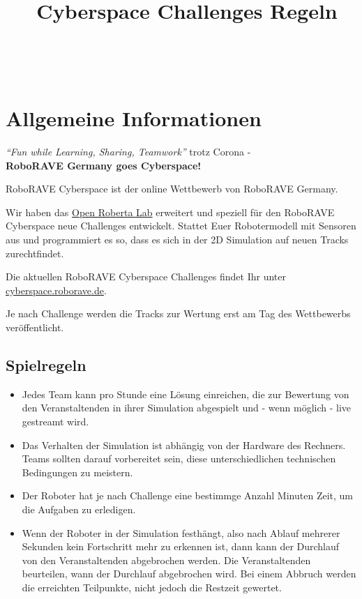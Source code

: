 \documentclass[a4paper,12pt]{article}
\begin{document}


\title{\tagYear\ Cyberspace Challenges Regeln}
\makeatletter
\let\inserttitle\@title
\makeatother
\begin{center}
	\rrcybLogo
	\huge                      %
	\bfseries                   %
	\\
	\inserttitle
\end{center}

\section{Allgemeine Informationen}

\begin{center}
\emph{"`Fun while Learning, Sharing, Teamwork"'} trotz Corona -
\\
\textbf{RoboRAVE Germany goes Cyberspace!}
\end{center}

RoboRAVE Cyberspace ist der online Wettbewerb von RoboRAVE Germany.

Wir haben das
\href{https://www.roberta-home.de/lab/}{Open Roberta Lab}
erweitert und speziell für den RoboRAVE Cyberspace neue Challenges entwickelt.
Stattet Euer Robotermodell mit Sensoren aus und programmiert es so, dass es
sich in der 2D Simulation auf neuen Tracks zurechtfindet.

Die aktuellen RoboRAVE Cyberspace Challenges findet Ihr unter
\href{https://cyberspace.roborave.de}{cyberspace.roborave.de}.

Je nach Challenge werden die Tracks zur Wertung erst am Tag des Wettbewerbs
veröffentlicht.

\subsection{Spielregeln}

\begin{itemize}
	\item Jedes Team kann pro Stunde eine Lösung einreichen, die zur
Bewertung von den Veranstaltenden in ihrer Simulation abgespielt und - wenn
möglich - live gestreamt wird.
	\item Das Verhalten der Simulation ist abhängig von der Hardware des
Rechners. Teams sollten darauf vorbereitet sein, diese unterschiedlichen
technischen Bedingungen zu meistern.
	\item Der Roboter hat je nach Challenge eine bestimmge Anzahl Minuten
Zeit, um die Aufgaben zu erledigen.
	\item Wenn der Roboter in der Simulation festhängt, also nach Ablauf
mehrerer Sekunden kein Fortschritt mehr zu erkennen ist, dann kann der
Durchlauf von den Veranstaltenden abgebrochen werden. Die Veranstaltenden
beurteilen, wann der Durchlauf abgebrochen wird. Bei einem Abbruch werden die
erreichten Teilpunkte, nicht jedoch die Restzeit gewertet.
\end{itemize}
\end{document}

